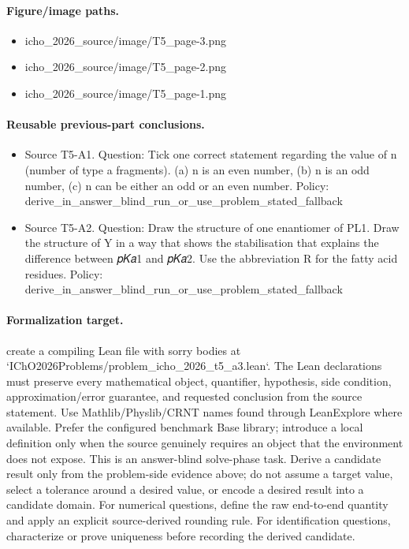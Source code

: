 \paragraph{Figure/image paths.}
\begin{itemize}
\item icho\_2026\_source/image/T5\_page-3.png
\item icho\_2026\_source/image/T5\_page-2.png
\item icho\_2026\_source/image/T5\_page-1.png
\end{itemize}

\paragraph{Reusable previous-part conclusions.}
\begin{itemize}
\item Source T5-A1. Question: Tick one correct statement regarding the value of n (number of type a fragments). (a) n is an even number, (b) n is an odd number, (c) n can be either an odd or an even number. Policy: derive\_in\_answer\_blind\_run\_or\_use\_problem\_stated\_fallback
\item Source T5-A2. Question: Draw the structure of one enantiomer of PL1. Draw the structure of Y in a way that shows the stabilisation that explains the difference between 𝑝𝐾𝑎1 and 𝑝𝐾𝑎2. Use the abbreviation R for the fatty acid residues. Policy: derive\_in\_answer\_blind\_run\_or\_use\_problem\_stated\_fallback
\end{itemize}

\paragraph{Formalization target.}
create a compiling Lean file with sorry bodies at `IChO2026Problems/problem\_icho\_2026\_t5\_a3.lean`.
The Lean declarations must preserve every mathematical object, quantifier, hypothesis, side condition, approximation/error guarantee, and requested conclusion from the source statement.
Use Mathlib/Physlib/CRNT names found through LeanExplore where available. Prefer the configured benchmark Base library; introduce a local definition only when the source genuinely requires an object that the environment does not expose.
This is an answer-blind solve-phase task. Derive a candidate result only from the problem-side evidence above; do not assume a target value, select a tolerance around a desired value, or encode a desired result into a candidate domain.
For numerical questions, define the raw end-to-end quantity and apply an explicit source-derived rounding rule. For identification questions, characterize or prove uniqueness before recording the derived candidate.

